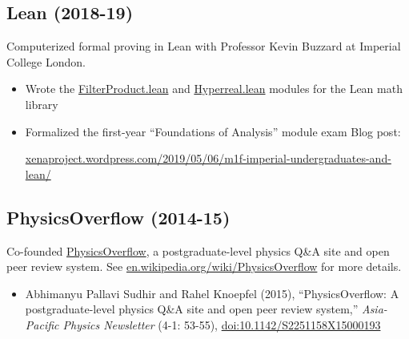 \documentclass{article}
\begin{document}
\subsection*{Lean (2018-19)}

Computerized formal proving in Lean with Professor Kevin Buzzard at Imperial College London.

\begin{itemize}
    \item Wrote the \href{https://github.com/leanprover-community/mathlib4/blob/3a7e6bb77ec51d8009107923a4c071a9473ecc5c/Mathlib/Order/Filter/FilterProduct.lean}{FilterProduct.lean} and \href{https://github.com/leanprover-community/mathlib4/blob/3a7e6bb77ec51d8009107923a4c071a9473ecc5c/Mathlib/Data/Real/Hyperreal.lean}{Hyperreal.lean} modules for the Lean math library
    \item Formalized the first-year ``Foundations of Analysis'' module exam Blog post:

          \href{https://xenaproject.wordpress.com/2019/05/06/m1f-imperial-undergraduates-and-lean/}{xenaproject.wordpress.com/2019/05/06/m1f-imperial-undergraduates-and-lean/}
\end{itemize}

\subsection*{PhysicsOverflow (2014-15)}

Co-founded \href{https://physicsoverflow.org}{PhysicsOverflow}, a postgraduate-level physics Q\&A site and open peer review system. See \href{https://en.wikipedia.org/wiki/PhysicsOverflow}{en.wikipedia.org/wiki/PhysicsOverflow} for more details.

\begin{itemize}

    \item
          Abhimanyu Pallavi Sudhir and Rahel Knoepfel (2015),
          ``PhysicsOverflow: A postgraduate-level physics Q\&A site and open peer review system,''
          \emph{Asia-Pacific Physics Newsletter} (4-1: 53-55),
          \href{https://dx.doi.org/10.1142/S2251158X15000193}{doi:10.1142/S2251158X15000193}

\end{itemize}
\end{document}
